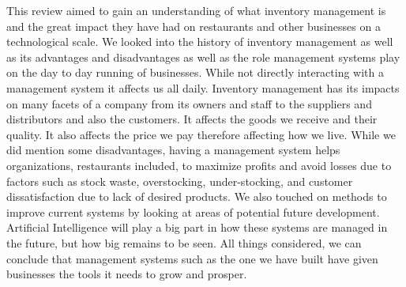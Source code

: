 This review aimed to gain an understanding of what inventory management is and the great impact they have had on restaurants and other businesses on a technological scale.
We looked into the history of inventory management as well as its advantages and disadvantages as well as the role management systems play on the day to day running of businesses. While not directly interacting with a management system it affects us all daily. 
Inventory management has its impacts on many facets of a company from its owners and staff to the suppliers and distributors and also the customers. It affects the goods we receive and their quality. It also affects the price we pay therefore affecting how we live. 
While we did mention some disadvantages, having a management system helps organizations, restaurants included, to maximize profits and avoid losses due to factors such as stock waste, overstocking, under-stocking, and customer dissatisfaction due to lack of desired products.
We also touched on methods to improve current systems by looking at areas of potential future development. Artificial Intelligence will play a big part in how these systems are managed in the future, but how big remains to be seen.
All things considered, we can conclude that management systems such as the one we have built have given businesses the tools it needs to grow and prosper.














